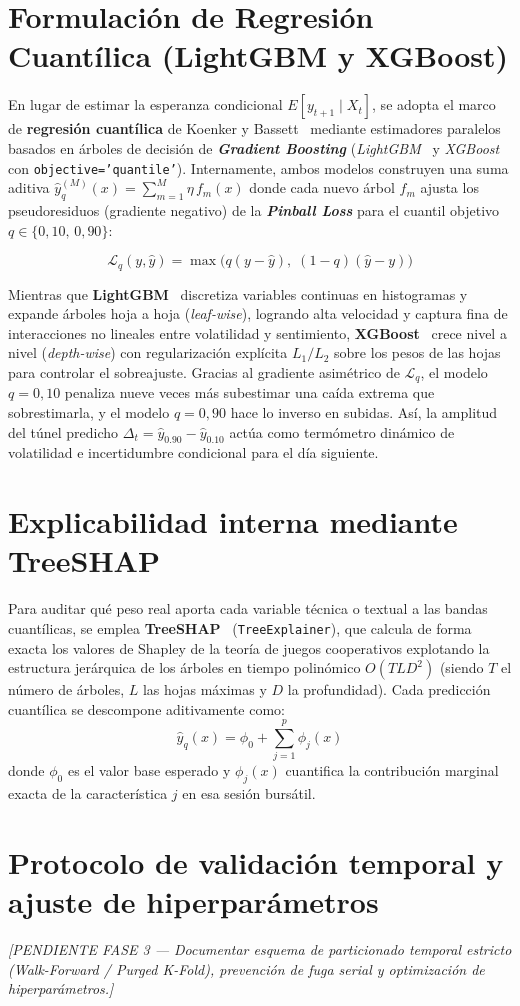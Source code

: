 \section{Formulación de Regresión Cuantílica (LightGBM y XGBoost)}
En lugar de estimar la esperanza condicional $E[y_{t+1} \mid X_t]$, se adopta el marco de \textbf{regresión cuantílica} de Koenker y Bassett~\cite{koenker1978quantile} mediante estimadores paralelos basados en árboles de decisión de \textbf{\textit{Gradient Boosting}} (\textit{LightGBM}~\cite{ke2017lightgbm} y \textit{XGBoost}~\cite{chen2016xgboost} con \texttt{objective='quantile'}). Internamente, ambos modelos construyen una suma aditiva $\hat{y}_q^{(M)}(x) = \sum_{m=1}^{M} \eta \, f_m(x)$ donde cada nuevo árbol $f_m$ ajusta los pseudoresiduos (gradiente negativo) de la \textbf{\textit{Pinball Loss}} para el cuantil objetivo $q \in \{0{,}10,\, 0{,}90\}$:

\begin{equation}
    \mathcal{L}_q(y, \hat{y}) = \max\Big(q(y - \hat{y}),\; (1 - q)(\hat{y} - y)\Big)
    \label{eq:pinball_loss}
\end{equation}

Mientras que \textbf{LightGBM}~\cite{ke2017lightgbm} discretiza variables continuas en histogramas y expande árboles hoja a hoja (\textit{leaf-wise}), logrando alta velocidad y captura fina de interacciones no lineales entre volatilidad y sentimiento, \textbf{XGBoost}~\cite{chen2016xgboost} crece nivel a nivel (\textit{depth-wise}) con regularización explícita $L_1/L_2$ sobre los pesos de las hojas para controlar el sobreajuste. Gracias al gradiente asimétrico de $\mathcal{L}_q$, el modelo $q=0{,}10$ penaliza nueve veces más subestimar una caída extrema que sobrestimarla, y el modelo $q=0{,}90$ hace lo inverso en subidas. Así, la amplitud del túnel predicho $\Delta_t = \hat{y}_{0.90} - \hat{y}_{0.10}$ actúa como termómetro dinámico de volatilidad e incertidumbre condicional para el día siguiente.

\section{Explicabilidad interna mediante TreeSHAP}
Para auditar qué peso real aporta cada variable técnica o textual a las bandas cuantílicas, se emplea \textbf{TreeSHAP}~\cite{lundberg2020treeshap} (\texttt{TreeExplainer}), que calcula de forma exacta los valores de Shapley de la teoría de juegos cooperativos explotando la estructura jerárquica de los árboles en tiempo polinómico $O(T L D^2)$ (siendo $T$ el número de árboles, $L$ las hojas máximas y $D$ la profundidad). Cada predicción cuantílica se descompone aditivamente como:
\begin{equation}
    \hat{y}_q(x) = \phi_0 + \sum_{j=1}^{p} \phi_j(x)
    \label{eq:treeshap}
\end{equation}
donde $\phi_0$ es el valor base esperado y $\phi_j(x)$ cuantifica la contribución marginal exacta de la característica $j$ en esa sesión bursátil.

\section{Protocolo de validación temporal y ajuste de hiperparámetros}
\textit{[PENDIENTE FASE 3 --- Documentar esquema de particionado temporal estricto (\textit{Walk-Forward} / \textit{Purged K-Fold}), prevención de fuga serial y optimización de hiperparámetros.]}
